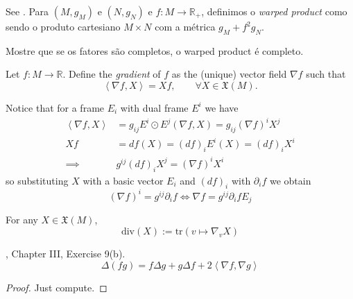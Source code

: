 \documentclass{book}
\begin{document}
\medskip\noindent

\begin{exercise}
\label{exercise-wraped-product}
See \cite{pet}. Para $(M,g_M)$ e $(N,g_N)$ e
$f:M \to \mathbb{R}_+$, definimos o
 {\it warped product} como sendo o produto
 cartesiano $M\times N$ com a métrica
 $g_M+f^2g_N$.

Mostre que se os fatores são completos, o
warped product é completo.
\end{exercise}

\begin{definition}
\label{definition-gradient}
Let  $f:M\to\mathbb{R}$. Define the {\it
gradient} of $f$ as the (unique) vector
field $\nabla f$ such that
\begin{equation}
\label{equation-gradient}
\left\langle{}\nabla f,X\right\rangle{}=Xf, \qquad \forall
X\in\mathfrak{X}(M).
\end{equation}
\end{definition}

Notice that for a frame $E_i$ with dual frame
$E^i$ we have
$$
\begin{aligned}
\left\langle{}\nabla f,X\right\rangle{}&=g_{ij}E^i\odot
E^j(\nabla f,X)
=g_{ij}(\nabla f)^iX^j\\
Xf&=df(X)=(df)_iE^i(X)=(df)_iX^i\\
\implies& g^{ij}(df)_iX^j=(\nabla f)^iX^i
\end{aligned}
$$
so substituting $X$ with a basic vector $E_i$
and $(df)_i$ with $\partial_if$ we
obtain
\begin{equation}
\label{equation-gradient-in-coordinates}
(\nabla f)^i=g^{ij}\partial_if \iff \nabla
f=g^{ij}\partial_ifE_j
\end{equation}

\begin{definition}
\label{definition-divergence}
For any $X\in \mathfrak{X}(M)$,
$$
\text{div}(X):=\text{tr}(v\mapsto \nabla_vX)
$$
\end{definition}

\begin{lemma}
\label{lemma-Laplacian-of-product}
\cite{doc}, Chapter III, Exercise 9(b).
\begin{equation}
\label{equation-Laplacian-of-product}
\Delta(fg)=f \Delta g + g \Delta
f+2\left\langle{}\nabla f,\nabla g\right\rangle{}
\end{equation}
\end{lemma}

\begin{proof}
Just compute.
\end{proof}
\end{document}
